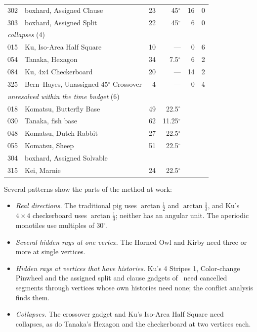 \documentclass[11pt]{article}
\theoremstyle{definition}
\theoremstyle{remark}
\begin{document}
{\begin{longtable}{rl r r r r}
302 & boxhard, Assigned Clause & 23 & 45$^\circ$ & 16 & 0 \\
303 & boxhard, Assigned Split & 22 & 45$^\circ$ & 6 & 0 \\
\midrule\multicolumn{6}{l}{\emph{collapses} (4)}\\
015 & Ku, Iso-Area Half Square & 10 & --- & 0 & 6 \\
054 & Tanaka, Hexagon & 34 & 7.5$^\circ$ & 6 & 2 \\
084 & Ku, 4x4 Checkerboard & 20 & --- & 14 & 2 \\
325 & Bern--Hayes, Unassigned 45$^\circ$ Crossover & 4 & --- & 0 & 4 \\
\midrule\multicolumn{6}{l}{\emph{unresolved within the time budget} (6)}\\
018 & Komatsu, Butterfly Base & 49 & 22.5$^\circ$ & \multicolumn{2}{l}{} \\
030 & Tanaka, fish base & 62 & 11.25$^\circ$ & \multicolumn{2}{l}{} \\
048 & Komatsu, Dutch Rabbit & 27 & 22.5$^\circ$ & \multicolumn{2}{l}{} \\
055 & Komatsu, Sheep & 51 & 22.5$^\circ$ & \multicolumn{2}{l}{} \\
304 & boxhard, Assigned Solvable &  &  & \multicolumn{2}{l}{} \\
315 & Kei, Marnie & 24 & 22.5$^\circ$ & \multicolumn{2}{l}{} \\
\bottomrule
\end{longtable}
}

Several patterns show the parts of the method at work:
\begin{itemize}
\item \emph{Real directions.} The traditional pig uses $\arctan\frac12$ and $\arctan\frac13$, and Ku's $4\times4$ checkerboard uses $\arctan\frac13$; neither has an angular unit. The aperiodic monotiles use multiples of $30^\circ$.
\item \emph{Several hidden rays at one vertex.} The Horned Owl and Kirby need three or more at single vertices.
\item \emph{Hidden rays at vertices that have histories.} Ku's 4 Stripes 1, Color-change Pinwheel and the assigned split and clause gadgets of~\cite{boxhard} need cancelled segments through vertices whose own histories need none; the conflict analysis finds them.
\item \emph{Collapses.} The crossover gadget and Ku's Iso-Area Half Square need collapses, as do Tanaka's Hexagon and the checkerboard at two vertices each.
\end{itemize}
\end{document}
